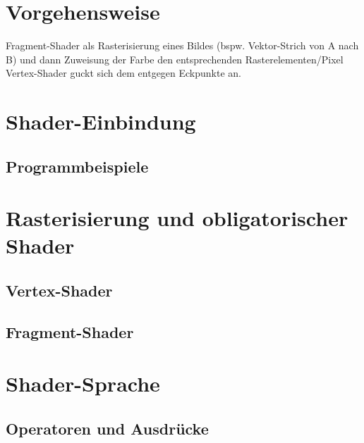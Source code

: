 \documentclass{scrreprt}
\begin{document}
\section{Vorgehensweise}
Fragment-Shader als Rasterisierung eines Bildes (bspw. Vektor-Strich von A nach B) und dann Zuweisung der Farbe den entsprechenden Rasterelementen/Pixel\\
Vertex-Shader guckt sich dem entgegen Eckpunkte an.
\section{Shader-Einbindung}
\subsection{Programmbeispiele}

\section{Rasterisierung und obligatorischer Shader}
\subsection{Vertex-Shader}
\subsection{Fragment-Shader}

\section{Shader-Sprache}
\subsection{Operatoren und Ausdrücke}
\end{document}
